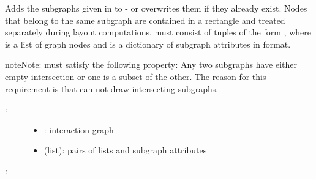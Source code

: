 \documentclass[letterpaper,10pt,english]{sphinxmanual}
\begin{document}
\begin{fulllineitems}
\label{\detokenize{InteractionGraphs:PyBoolNet.InteractionGraphs.add_style_subgraphs}}
Adds the subgraphs given in  to  - or overwrites them if they already exist.
Nodes that belong to the same  subgraph are contained in a rectangle and treated separately during layout computations.
 must consist of tuples of the form ,  where  is a list of graph nodes and 
is a dictionary of subgraph attributes in  format.

\begin{sphinxadmonition}{note}{Note:}
 must satisfy the following property:
Any two subgraphs have either empty intersection or one is a subset of the other.
The reason for this requirement is that  can not draw intersecting subgraphs.
\end{sphinxadmonition}
\begin{description}
\item[{:}] \leavevmode\begin{itemize}
\item {} 
: interaction graph

\item {} 
 (list): pairs of lists and subgraph attributes

\end{itemize}

\end{description}

:

\begin{sphinxVerbatim}[commandchars=\\\{\}]
  \PYG{p}{[}\PYG{p}{]} 
  \PYG{p}{[}\PYG{p}{]} 
  \PYG{p}{[}\PYG{p}{]}
 
\end{sphinxVerbatim}

\end{fulllineitems}
\end{document}
